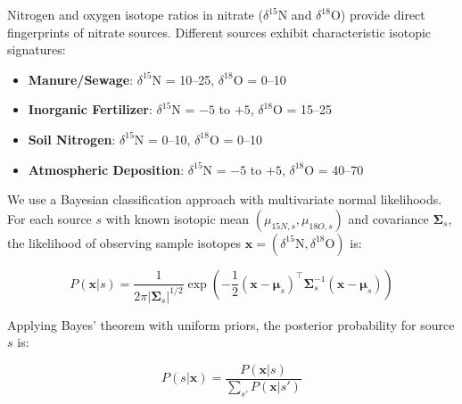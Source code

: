 \documentclass[12pt,a4paper]{article}
\theoremstyle{plain}
\theoremstyle{definition}
\theoremstyle{remark}
\begin{document}
Nitrogen and oxygen isotope ratios in nitrate ($\delta^{15}$N and $\delta^{18}$O) provide direct fingerprints of nitrate sources. Different sources exhibit characteristic isotopic signatures:

\begin{itemize}
	\item \textbf{Manure/Sewage}: $\delta^{15}$N = 10--25\textperthousand, $\delta^{18}$O = 0--10\textperthousand
	\item \textbf{Inorganic Fertilizer}: $\delta^{15}$N = $-5$ to $+5$\textperthousand, $\delta^{18}$O = 15--25\textperthousand
	\item \textbf{Soil Nitrogen}: $\delta^{15}$N = 0--10\textperthousand, $\delta^{18}$O = 0--10\textperthousand
	\item \textbf{Atmospheric Deposition}: $\delta^{15}$N = $-5$ to $+5$\textperthousand, $\delta^{18}$O = 40--70\textperthousand
\end{itemize}

We use a Bayesian classification approach with multivariate normal likelihoods. For each source $s$ with known isotopic mean $(\mu_{15N,s}, \mu_{18O,s})$ and covariance $\boldsymbol{\Sigma}_s$, the likelihood of observing sample isotopes $\mathbf{x} = (\delta^{15}\text{N}, \delta^{18}\text{O})$ is:

\begin{equation}
	P(\mathbf{x} | s) = \frac{1}{2\pi |\boldsymbol{\Sigma}_s|^{1/2}} \exp\left( -\frac{1}{2} (\mathbf{x} - \boldsymbol{\mu}_s)^\top \boldsymbol{\Sigma}_s^{-1} (\mathbf{x} - \boldsymbol{\mu}_s) \right)
\end{equation}

Applying Bayes' theorem with uniform priors, the posterior probability for source $s$ is:

\begin{equation}
	P(s | \mathbf{x}) = \frac{P(\mathbf{x} | s)}{\sum_{s'} P(\mathbf{x} | s')}
\end{equation}
\end{document}

